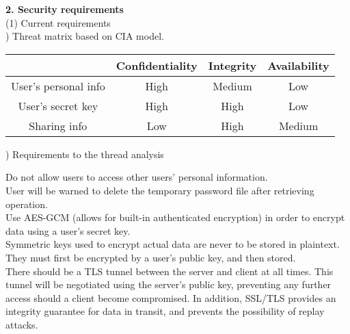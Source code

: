 \documentclass[11pt, letterpaper]{article}
\newcommand{\DesignSection}[1]
{\noindent\textbf{#1}\\}
\newcommand{\IndentBullet}[1]
{\indent\textbullet{} #1\\}
\begin{document}
\DesignSection{2. Security requirements}
\noindent(1) Current requirements\\
) Threat matrix based on CIA model.

\setlength{\tabcolsep}{5pt}
\indent\begin{tabular}{| c | c | c | c |}
	\hline
	  & Confidentiality & Integrity & Availability \\
	\hline
	User's personal info & High & Medium & Low \\
	\hline
	User's secret key & High & High & Low \\
	\hline
	Sharing info & Low & High & Medium \\
	\hline
\end{tabular}

\bigskip
{}) Requirements to the thread analysis

\IndentBullet{Do not allow users to access other users’ personal information.}
\IndentBullet{User will be warned to delete the temporary password file after retrieving operation.}
\IndentBullet{Use AES-GCM (allows for built-in authenticated encryption) in order to encrypt data using a user’s secret key.}
\IndentBullet{Symmetric keys used to encrypt actual data are never to be stored in plaintext. They must first be encrypted by a user’s public key, and then stored.}
\IndentBullet{There should be a TLS tunnel between the server and client at all times. This tunnel will be negotiated using the server’s public key, preventing any further access should a client become compromised. In addition, SSL/TLS provides an integrity guarantee for data in transit, and prevents the possibility of replay attacks.}
\end{document}
